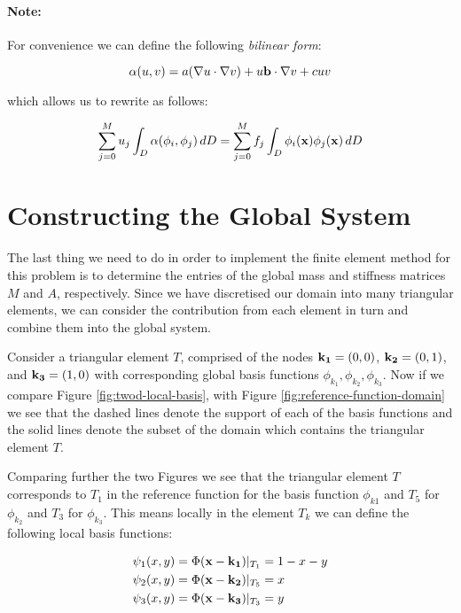 \paragraph{Note:}

For convenience we can define the following \textit{bilinear form}:

\begin{equation}\label{eq:twod-deterministic-bilinear}
    \alpha(u,v) = a(\nabla u \cdot \nabla v) + u\mathbf{b} \cdot \nabla v
                 + cuv
\end{equation}

which allows us to rewrite  as follows:

\begin{equation}
    \sum_{j = 0}^Mu_j\int_D\alpha(\phi_i,\phi_j)\, dD
        = \sum_{j = 0}^Mf_j\int_D\phi_i(\mathbf{x})\phi_j(\mathbf{x})\, dD
\end{equation}

\section{Constructing the Global System}

The last thing we need to do in order to implement the finite element method
for this problem is to determine the entries of the global mass and stiffness
matrices $M$ and $A$, respectively. Since we have discretised our domain into
many triangular elements, we can consider the contribution from each element
in turn and combine them into the global system.

Consider a triangular element $T$, comprised of the nodes $\mathbf{k_1} = (0,0)$,
$\mathbf{k_2} = (0,1)$, and $\mathbf{k_3} = (1,0)$ with corresponding global basis functions
$\phi_{k_1}, \phi_{k_2}, \phi_{k_3}$. Now if we compare Figure
\ref{fig:twod-local-basis}, with Figure \ref{fig:reference-function-domain}
we see that the dashed lines denote the support of each of the basis functions
and the solid lines denote the subset of the domain which contains the triangular
element $T$.

Comparing further the two Figures we see that the triangular element $T$
corresponds to $T_1$ in the reference function for the basis function $\phi_{k1}$
and $T_5$ for $\phi_{k_2}$ and $T_3$ for $\phi_{k_3}$. This means locally in the
element $T_k$ we can define the following local basis functions:

\begin{align}\label{eq:twod-local-basis}
    \begin{split}
        \psi_1(x, y) = \Phi(\mathbf{x} - \mathbf{k_1})|_{T_1} &= 1 - x - y \\
        \psi_2(x, y) = \Phi(\mathbf{x} - \mathbf{k_2})|_{T_5} &= x \\
        \psi_3(x, y) = \Phi(\mathbf{x} - \mathbf{k_3})|_{T_3} &= y
    \end{split}
\end{align}

